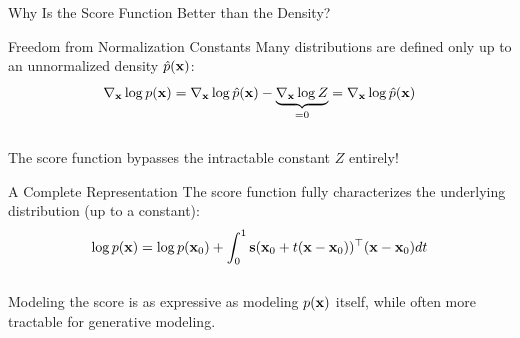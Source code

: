 \documentclass{beamer}
\begin{document}
\begin{frame}{Why Is the Score Function Better than the Density?}
	\begin{block}{Freedom from Normalization Constants}
		Many distributions are defined only up to an unnormalized density $\hat{p}(\mathbf{x})$:
		\vspace{-0.3cm}
		\[
			\nabla_{\mathbf{x}} \log p(\mathbf{x}) = \nabla_{\mathbf{x}} \log \hat{p}(\mathbf{x}) - \underbrace{\nabla_{\mathbf{x}} \log Z}_{=0} = \nabla_{\mathbf{x}} \log \hat{p}(\mathbf{x})
		\]
		\vspace{-0.3cm} \\
		The score function bypasses the intractable constant $Z$ entirely!
	\end{block}
	\eqpause
	\begin{block}{A Complete Representation}
		The score function fully characterizes the underlying distribution (up to a constant):
		\vspace{-0.2cm}
		\[
			\log p(\mathbf{x}) = \log p(\mathbf{x}_0) + \int_0^1 \mathbf{s}(\mathbf{x}_0 + t(\mathbf{x} - \mathbf{x}_0))^\top (\mathbf{x} - \mathbf{x}_0) dt
		\]
		\vspace{-0.5cm} \\
		Modeling the score is as expressive as modeling $p(\mathbf{x})$ itself, while often more tractable for generative modeling.
	\end{block}
\end{frame}
\end{document}
